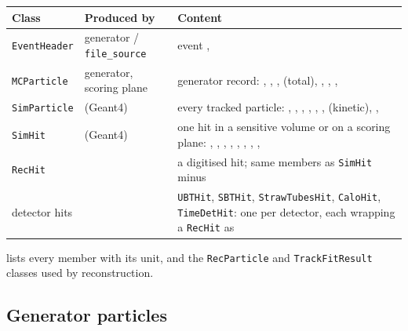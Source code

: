 \begin{center}
\small
\begin{tabularx}{\linewidth}{P{2.6cm} P{2.9cm} L}
\toprule
Class & Produced by & Content \\
\midrule
\texttt{EventHeader}   & generator / \texttt{file\_source} & event ,  \\
\texttt{MCParticle}    & generator, scoring plane & generator record: , , ,
                                                 (total), , ,
                                                ,  \\
\texttt{SimParticle}   &  (Geant4)  & every tracked particle: , ,
                                                , , ,
                                                ,  (kinetic),
                                                ,  \\
\texttt{SimHit}        &  (Geant4)  & one hit in a sensitive volume or on a scoring plane: ,
                                                , , ,
                                                , ,
                                                , ,  \\
\texttt{RecHit}        &          & a digitised hit; same members as \texttt{SimHit}
                                                minus  \\
detector hits          &          & \texttt{UBTHit}, \texttt{SBTHit}, \texttt{StrawTubesHit},
                                                \texttt{CaloHit}, \texttt{TimeDetHit}: one per detector,
                                                each wrapping a \texttt{RecHit} as  \\
\bottomrule
\end{tabularx}
\end{center}

 lists every member with its unit, and the
\texttt{RecParticle} and \texttt{TrackFitResult} classes used by
reconstruction.

\subsection{Generator particles}
\label{sec:mcstatus}

